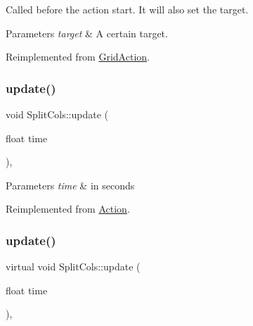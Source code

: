 Called before the action start. It will also set the target.


\begin{DoxyParams}{Parameters}
{\em target} & A certain target. \\
\hline
\end{DoxyParams}


Reimplemented from \hyperlink{classGridAction_a33e2c1bc95bbcf6b16428097b4fd4b61}{Grid\+Action}.

\mbox{\label{classSplitCols_afa102b8f74e40bb4484a7470ff64fbef}} 
\subsubsection{\texorpdfstring{update()}{update()}\hspace{0.1cm}{\footnotesize\ttfamily [1/2]}}
{\footnotesize\ttfamily void Split\+Cols\+::update (\begin{DoxyParamCaption}\item[{float}]{time }\end{DoxyParamCaption})\hspace{0.3cm}{\ttfamily [override]}, {\ttfamily [virtual]}}


\begin{DoxyParams}{Parameters}
{\em time} & in seconds \\
\hline
\end{DoxyParams}


Reimplemented from \hyperlink{classAction_a937e646e63915e33ad05ba149bfcf239}{Action}.

\mbox{\label{classSplitCols_ae1252964ea517f3e3254654758406a63}} 
\subsubsection{\texorpdfstring{update()}{update()}\hspace{0.1cm}{\footnotesize\ttfamily [2/2]}}
{\footnotesize\ttfamily virtual void Split\+Cols\+::update (\begin{DoxyParamCaption}\item[{float}]{time }\end{DoxyParamCaption})\hspace{0.3cm}{\ttfamily [override]}, {\ttfamily [virtual]}}


